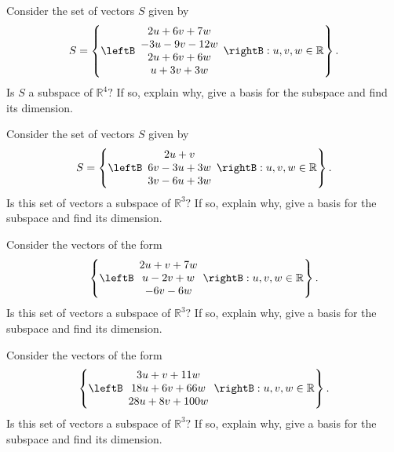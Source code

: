 \begin{enumialphparenastyle}
\begin{ex} Consider the set of vectors $S$ given by 
\begin{equation*}
S = 
\left\{ \leftB
\begin{array}{c}
2u+6v+7w \\ 
-3u-9v-12w \\ 
2u+6v+6w \\ 
u+3v+3w
\end{array}
\rightB :u,v,w\in \mathbb{R}\right\} .
\end{equation*}
Is $S$ a subspace of $\mathbb{R}^{4}?$ If so, explain why,
give a basis for the subspace and find its dimension.
\end{ex}

\begin{ex} Consider the set of vectors $S$ given by 
\begin{equation*}
S = 
\left\{ \leftB 
\begin{array}{c}
2u+v \\ 
6v-3u+3w \\ 
3v-6u+3w
\end{array}
\rightB :u,v,w\in \mathbb{R}\right\} .
\end{equation*}
Is this set of vectors a subspace of $\mathbb{R}^{3}?$ If so, explain why,
give a basis for the subspace and find its dimension.
\end{ex}

\begin{ex} Consider the vectors of the form 
\begin{equation*}
\left\{ \leftB
\begin{array}{c}
2u+v+7w \\ 
u-2v+w \\ 
-6v-6w
\end{array}
\rightB :u,v,w\in \mathbb{R}\right\} .
\end{equation*}
Is this set of vectors a subspace of $\mathbb{R}^{3}?$ If so, explain why,
give a basis for the subspace and find its dimension.
\end{ex}

\begin{ex} Consider the vectors of the form 
\begin{equation*}
\left\{ \leftB 
\begin{array}{c}
3u+v+11w \\ 
18u+6v+66w \\ 
28u+8v+100w
\end{array}
\rightB :u,v,w\in \mathbb{R}\right\} .
\end{equation*}
Is this set of vectors a subspace of $\mathbb{R}^{3}?$ If so, explain why,
give a basis for the subspace and find its dimension.
\end{ex}


\end{enumialphparenastyle}
